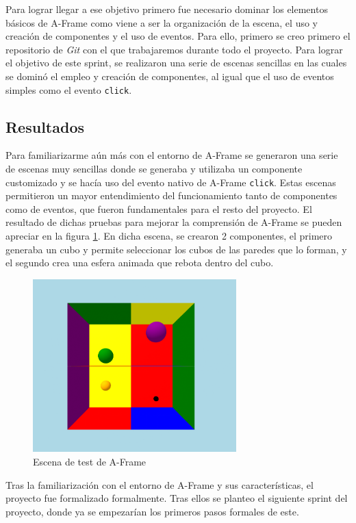 \documentclass[a4paper, 12pt]{book}
\begin{document}
Para lograr llegar a ese objetivo primero fue necesario dominar los elementos básicos de A-Frame como viene a ser la organización de la escena, el uso y creación de componentes y el uso de eventos. 
Para ello, primero se creo primero el repositorio de \textit{Git} con el que trabajaremos durante todo el proyecto. Para lograr el objetivo de este sprint, se realizaron una serie de escenas sencillas en las cuales se dominó el empleo y creación de componentes, al igual que el uso de eventos simples como el evento \texttt{click}.
\subsection{Resultados}
\label{subsec:resultados0}
Para familiarizarme aún más con el entorno de A-Frame se generaron una serie de escenas muy sencillas donde se generaba y utilizaba un componente customizado y se hacía uso del evento nativo de A-Frame \texttt{click}. Estas escenas permitieron un mayor entendimiento del funcionamiento tanto de componentes como de eventos, que fueron fundamentales para el resto del proyecto.
El resultado de dichas pruebas para mejorar la comprensión de A-Frame se pueden apreciar en la figura \ref{fig:sprint0}. En dicha escena, se crearon 2 componentes, el primero generaba un cubo y permite seleccionar los cubos de las paredes que lo forman, y el segundo crea una esfera animada que rebota dentro del cubo. 
\begin{figure}[H] 
  \centering
  \includegraphics[width=0.7\textwidth]{img/primera_escena.png} 
  \caption{Escena de test de A-Frame}
  \label{fig:sprint0}
\end{figure}

Tras la familiarización con el entorno de A-Frame y sus características, el proyecto fue formalizado formalmente. Tras ellos se planteo el siguiente sprint del proyecto, donde ya se empezarían los primeros pasos formales de este. 
\end{document}

